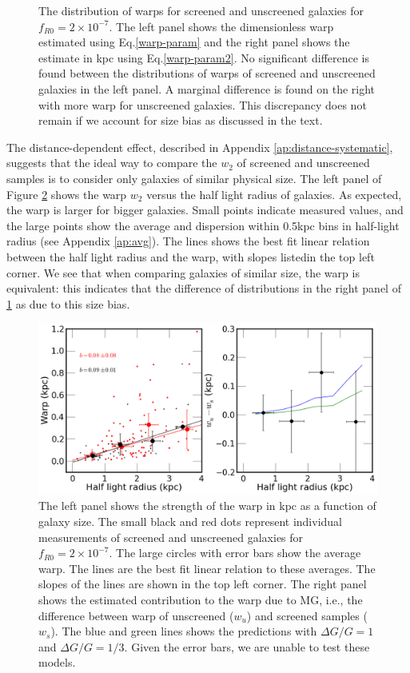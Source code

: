 \documentclass[useAMS,usenatbib,twocolumn]{mn2e}
\begin{document}
\begin{figure}
\begin{center}
\caption{ The distribution of warps for screened and unscreened galaxies for
$f_{R0} = 2\times10^{-7}$.
The left panel shows the dimensionless warp estimated using 
Eq.\ref{warp-param} and the  right panel shows the estimate in kpc using   
  Eq.\ref{warp-param2}. No significant difference is found
between the distributions of warps of  screened and unscreened galaxies in 
the left panel. A marginal difference is found on the right with more warp
for unscreened galaxies. This discrepancy does not remain if we account for size
bias as discussed in the text.}
\label{fig:warp-distr}
\end{center}
\end{figure}

The distance-dependent effect, described in Appendix
\ref{ap:distance-systematic}, suggests that the ideal way to
compare the $w_2$ of screened and unscreened samples is to consider
only galaxies of similar physical size.
The left panel of Figure \ref{fig:size-warp-kpc} shows the
warp $w_2$ versus the half light radius of galaxies. As expected, the
warp is larger for bigger galaxies. Small points indicate measured
values, and the large points show the average and dispersion within
0.5kpc bins in half-light radius (see Appendix \ref{ap:avg}).
The lines shows the best fit linear relation between the
half light radius and the warp, with slopes listedin the top left corner.
We see that when comparing galaxies of similar size, the warp is
equivalent: this indicates that the difference of distributions in the
right panel of \ref{fig:warp-distr} as due to this size bias. 

\begin{figure}
\begin{center}
\includegraphics[scale=0.43]{figures/size-warpness-kpc.png}
\caption{The left panel shows the strength of the warp in kpc as a function of
galaxy size. The small black and red dots
represent individual measurements of screened and unscreened galaxies for
$f_{R0} = 2 \times10^{-7}$. The large circles
with error bars show the average warp.  The
lines are the best fit linear relation to these averages. The slopes of
the lines are shown in the top left corner. The right panel shows the estimated
contribution to the warp due to MG, i.e., the difference between warp
of unscreened
($w_u$) and screened samples ($w_s$). The blue and green lines shows the
predictions with $\Delta G/G = 1$ and $\Delta G/G = 1/3$. Given the error
bars, we are unable to test these models. 
}
\label{fig:size-warp-kpc}
\end{center}
\end{figure}
\end{document}
